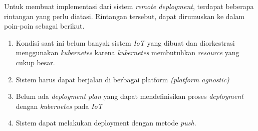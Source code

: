 Untuk membuat implementasi dari sistem \textit{remote deployment}, terdapat beberapa rintangan yang perlu diatasi. Rintangan tersebut, dapat dirumuskan ke dalam poin-poin sebagai berikut.

\begin{enumerate}
  \item Kondisi saat ini belum banyak sistem \textit{IoT} yang dibuat dan diorkestrasi menggunakan \textit{kubernetes} karena \textit{kubernetes} membutuhkan \textit{resource} yang cukup besar.
  \item Sistem harus dapat berjalan di berbagai platform \textit{(platform agnostic)}
  \item Belum ada \textit{deployment plan} yang dapat mendefinisikan proses \textit{deployment} dengan \textit{kubernetes} pada \textit{IoT}
  \item Sistem dapat melakukan deployment dengan metode \textit{push}.
\end{enumerate}
